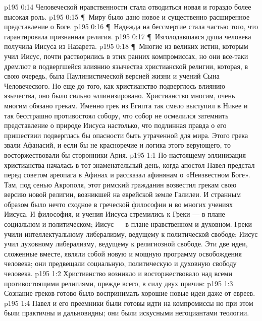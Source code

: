 \vs p195 0:14 \bibnobreakspace Человеческой нравственности стала отводиться новая и гораздо более высокая роль.
\vs p195 0:15 \P\ \bibnobreakspace Миру было дано новое и существенно расширенное представление о Боге.
\vs p195 0:16 \P\ \bibnobreakspace Надежда на бессмертие стала частью того, что гарантировала признанная религия.
\vs p195 0:17 \P\ \bibnobreakspace Изголодавшаяся душа человека получила Иисуса из Назарета.
\vs p195 0:18 \P\ Многие из великих истин, которым учил Иисус, почти растворились в этих ранних компромиссах, но они все\hyp{}таки дремлют в подвергшейся влиянию язычества христианской религии, которая, в свою очередь, была Паулинистической версией жизни и учений Сына Человеческого. Но еще до того, как христианство подверглось влиянию язычества, оно было сильно эллинизировано. Христианство многим, очень многим обязано грекам. Именно грек из Египта так смело выступил в Никее и так бесстрашно противостоял собору, что собор не осмелился затемнить представление о природе Иисуса настолько, что подлинная правда о его пришествии подверглась бы опасности быть утраченной для мира. Этого грека звали Афанасий, и если бы не красноречие и логика этого верующего, то восторжествовали бы сторонники Ария.
\vs p195 1:1 По\hyp{}настоящему эллинизация христианства началась в тот знаменательный день, когда апостол Павел предстал перед советом ареопага в Афинах и рассказал афинянам о «Неизвестном Боге». Там, под сенью Акрополя, этот римский гражданин возвестил грекам свою версию новой религии, возникшей на еврейской земле Галилеи. И странным образом было нечто сходное в греческой философии и во многих учениях Иисуса. И философия, и учения Иисуса стремились к  Греки --- в плане социальном и политическом; Иисус --- в плане нравственном и духовном. Греки учили интеллектуальному либерализму, ведущему к политической свободе; Иисус учил духовному либерализму, ведущему к религиозной свободе. Эти две идеи, сложенные вместе, являли собой новую и мощную программу освобождения человека; они предвещали социальную, политическую и духовную свободу человека.
\vs p195 1:2 Христианство возникло и восторжествовало над всеми противостоящими религиями, прежде всего, в силу двух причин:
\vs p195 1:3 \bibnobreakspace Сознание греков готово было воспринимать хорошие новые идеи даже от евреев.
\vs p195 1:4 \bibnobreakspace Павел и его преемники были готовы идти на компромиссы но при этом были практичны и дальновидны; они были искусными негоциантами теологии.
